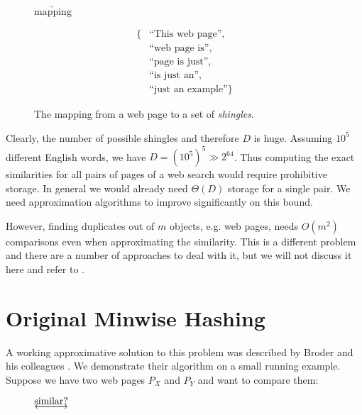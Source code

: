 \documentclass[a4paper]{article}
\begin{document}
\begin{figure}[H]
\begin{center}
\hspace{1cm} $\underrightarrow{\text{mapping}}$ \hspace{1cm}
\parbox{2cm}{
\begin{equation*}
\begin{split}
 \text{\{} & \text{``This web page''},\\ & \text{``web page is''},\\ & \text{``page is just''},\\ & \text{``is just an''},\\ & \text{``just an example''} \text{\}}
\end{split}
\end{equation*}
}
\end{center}
\caption{The mapping from a web page to a set of \emph{shingles}.}
\label{fig:shingle}
\end{figure}

Clearly, the number of possible shingles and therefore $D$ is huge. Assuming $10^5$ different English words, we have $D=\left(10^5\right)^5 \gg 2^{64}$. Thus computing the exact similarities for all pairs of pages of a web search would require prohibitive storage. In general we would already need $\Theta(D)$ storage for a single pair. We need approximation algorithms to improve significantly on this bound.

However, finding duplicates out of $m$ objects, e.g. web pages, needs $O(m^2)$ comparisons even when approximating the similarity. This is a different problem and there are a  number of approaches to deal with it, but we will not discuss it here and refer to \citep{BroderGMZ97,STOC02*380}.

\section{Original Minwise Hashing}

A working approximative solution to this problem was described by Broder and his colleagues \citep{Broder:1998,BroderGMZ97}. We demonstrate their algorithm on a small running example. Suppose we have two web pages $P_X$ and $P_Y$ and want to compare them:

\begin{figure}[H]
\begin{center}
\hspace{1cm} $\underleftrightarrow{\text{similar?}}$ \hspace{1cm}
\end{center}
\end{figure}
\end{document}
